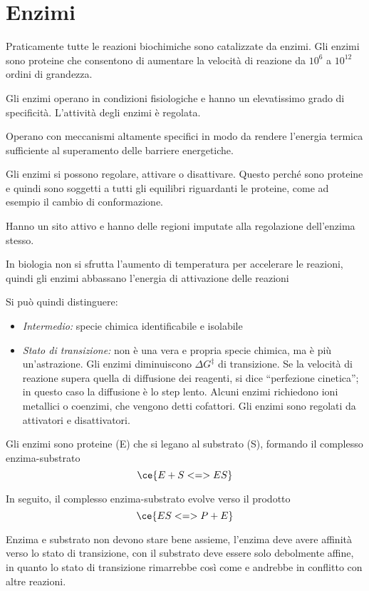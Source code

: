 \chapter{Enzimi}


Praticamente tutte le reazioni biochimiche sono catalizzate da enzimi. Gli enzimi sono proteine che consentono di aumentare la velocità di reazione da $10^6$ a $10^{12}$ ordini di grandezza.

Gli enzimi operano in condizioni fisiologiche e hanno un elevatissimo grado di specificità. L'attività degli enzimi è regolata.

Operano con meccanismi altamente specifici in modo da rendere l'energia termica sufficiente al superamento delle barriere energetiche.

Gli enzimi si possono regolare, attivare o disattivare. Questo perché sono proteine e quindi sono soggetti a tutti gli equilibri riguardanti le proteine, come ad esempio il cambio di conformazione.

Hanno un sito attivo e hanno delle regioni imputate alla regolazione dell'enzima stesso.

In biologia non si sfrutta l'aumento di temperatura per accelerare le reazioni, quindi gli enzimi abbassano l'energia di attivazione delle reazioni

Si può quindi distinguere:
\begin{itemize}
\item \emph{Intermedio:} specie chimica identificabile e isolabile
\item \emph{Stato di transizione:} non è una vera e propria specie chimica, ma è più un'astrazione. Gli enzimi diminuiscono $\Delta G^{\ddagger}$ di transizione. Se la velocità di reazione supera quella di diffusione dei reagenti, si dice ``perfezione cinetica''; in questo caso la diffusione è lo step lento. Alcuni enzimi richiedono ioni metallici o coenzimi, che vengono detti cofattori. Gli enzimi sono regolati da attivatori e disattivatori.
\end{itemize}

Gli enzimi sono proteine (E) che si legano al substrato (S), formando il complesso enzima-substrato
\[
\ce{E+S <=> ES}
\]

In seguito, il complesso enzima-substrato evolve verso il prodotto
\[
\ce{ES <=> P+E}
\]

Enzima e substrato non devono stare bene assieme, l'enzima deve avere affinità verso lo stato di transizione, con il substrato deve essere solo debolmente affine, in quanto lo stato di transizione rimarrebbe così come e andrebbe in conflitto con altre reazioni.

